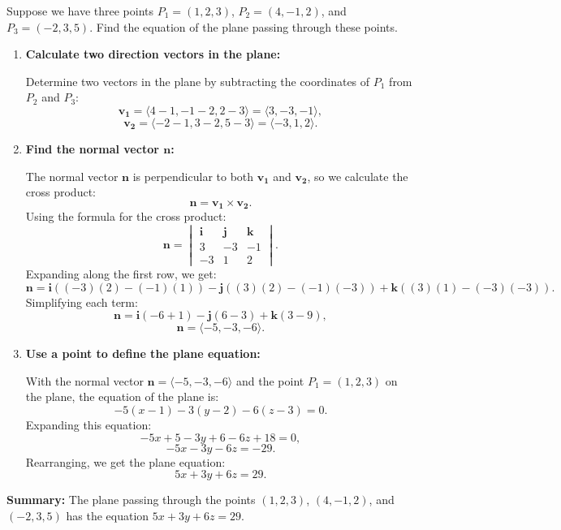 \exampleline
\begin{example}
Suppose we have three points \( P_1 = (1, 2, 3) \), \( P_2 = (4, -1, 2) \), and \( P_3 = (-2, 3, 5) \). Find the equation of the plane passing through these points.

\begin{solution}

\begin{enumerate}
    \item \textbf{Calculate two direction vectors in the plane:}
    
    \noindent Determine two vectors in the plane by subtracting the coordinates of \( P_1 \) from \( P_2 \) and \( P_3 \):
    \[
    \mathbf{v_1} = \langle 4 - 1, -1 - 2, 2 - 3 \rangle = \langle 3, -3, -1 \rangle,
    \]
    \[
    \mathbf{v_2} = \langle -2 - 1, 3 - 2, 5 - 3 \rangle = \langle -3, 1, 2 \rangle.
    \]

    \item \textbf{Find the normal vector \( \mathbf{n} \):}
    
    \noindent The normal vector \( \mathbf{n} \) is perpendicular to both \( \mathbf{v_1} \) and \( \mathbf{v_2} \), so we calculate the cross product:
    \[
    \mathbf{n} = \mathbf{v_1} \times \mathbf{v_2}.
    \]
    Using the formula for the cross product:
    \[
    \mathbf{n} = \begin{vmatrix} \mathbf{i} & \mathbf{j} & \mathbf{k} \\ 3 & -3 & -1 \\ -3 & 1 & 2 \end{vmatrix}.
    \]
    Expanding along the first row, we get:
    \[
    \mathbf{n} = \mathbf{i}((-3)(2) - (-1)(1)) - \mathbf{j}((3)(2) - (-1)(-3)) + \mathbf{k}((3)(1) - (-3)(-3)).
    \]
    Simplifying each term:
    \[
    \mathbf{n} = \mathbf{i}(-6 + 1) - \mathbf{j}(6 - 3) + \mathbf{k}(3 - 9),
    \]
    \[
    \mathbf{n} = \langle -5, -3, -6 \rangle.
    \]

    \item \textbf{Use a point to define the plane equation:}
    
    \noindent With the normal vector \( \mathbf{n} = \langle -5, -3, -6 \rangle \) and the point \( P_1 = (1, 2, 3) \) on the plane, the equation of the plane is:
    \[
    -5(x - 1) - 3(y - 2) - 6(z - 3) = 0.
    \]
    Expanding this equation:
    \[
    -5x + 5 - 3y + 6 - 6z + 18 = 0,
    \]
    \[
    -5x - 3y - 6z = -29.
    \]
    Rearranging, we get the plane equation:
    \[
    5x + 3y + 6z = 29.
    \]
\end{enumerate}

\noindent \textbf{Summary:} The plane passing through the points \( (1, 2, 3) \), \( (4, -1, 2) \), and \( (-2, 3, 5) \) has the equation \( 5x + 3y + 6z = 29 \).

\end{solution}
\end{example}




